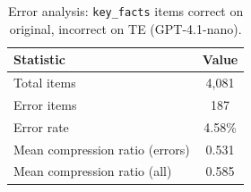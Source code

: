 \documentclass{article}
\begin{document}
\begin{table}[h]
  \caption{Error analysis: \texttt{key\_facts} items correct on original, incorrect on TE (GPT-4.1-nano).}
  \label{tab:a4}
  \centering
  \small
  \begin{tabular}{lc}
    \toprule
    Statistic & Value \\
    \midrule
    Total items & 4{,}081 \\
    Error items & 187 \\
    Error rate & 4.58\% \\
    Mean compression ratio (errors) & 0.531 \\
    Mean compression ratio (all) & 0.585 \\
    \bottomrule
  \end{tabular}
\end{table}

% 
\end{document}
